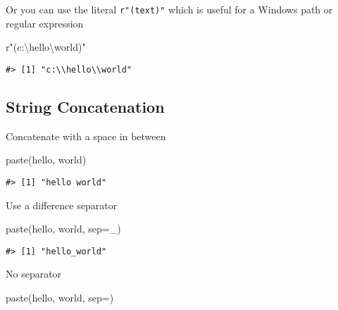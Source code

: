 \documentclass[
]{book}
\newenvironment{Shaded}{\begin{snugshade}}{\end{snugshade}}
\newcommand{\AttributeTok}[1]{\textcolor[rgb]{0.77,0.63,0.00}{#1}}
\newcommand{\FunctionTok}[1]{\textcolor[rgb]{0.00,0.00,0.00}{#1}}
\newcommand{\NormalTok}[1]{#1}
\newcommand{\StringTok}[1]{\textcolor[rgb]{0.31,0.60,0.02}{#1}}
\begin{document}
Or you can use the literal \texttt{r"(text)"} which is useful for a Windows path or regular expression

\begin{Shaded}
\begin{Highlighting}[]
\NormalTok{r}\StringTok{"(c:\textbackslash{}hello\textbackslash{}world)"}
\end{Highlighting}
\end{Shaded}

\begin{verbatim}
#> [1] "c:\\hello\\world"
\end{verbatim}

\hypertarget{string-concatenation}{%
\subsection{String Concatenation}\label{string-concatenation}}

Concatenate with a space in between

\begin{Shaded}
\begin{Highlighting}[]
\FunctionTok{paste}\NormalTok{(}\StringTok{\textquotesingle{}hello\textquotesingle{}}\NormalTok{, }\StringTok{\textquotesingle{}world\textquotesingle{}}\NormalTok{)}
\end{Highlighting}
\end{Shaded}

\begin{verbatim}
#> [1] "hello world"
\end{verbatim}

Use a difference separator

\begin{Shaded}
\begin{Highlighting}[]
\FunctionTok{paste}\NormalTok{(}\StringTok{\textquotesingle{}hello\textquotesingle{}}\NormalTok{, }\StringTok{\textquotesingle{}world\textquotesingle{}}\NormalTok{, }\AttributeTok{sep=}\StringTok{\textquotesingle{}\_\textquotesingle{}}\NormalTok{)}
\end{Highlighting}
\end{Shaded}

\begin{verbatim}
#> [1] "hello_world"
\end{verbatim}

No separator

\begin{Shaded}
\begin{Highlighting}[]
\FunctionTok{paste}\NormalTok{(}\StringTok{\textquotesingle{}hello\textquotesingle{}}\NormalTok{, }\StringTok{\textquotesingle{}world\textquotesingle{}}\NormalTok{, }\AttributeTok{sep=}\StringTok{\textquotesingle{}\textquotesingle{}}\NormalTok{)}
\end{Highlighting}
\end{Shaded}
\end{document}
